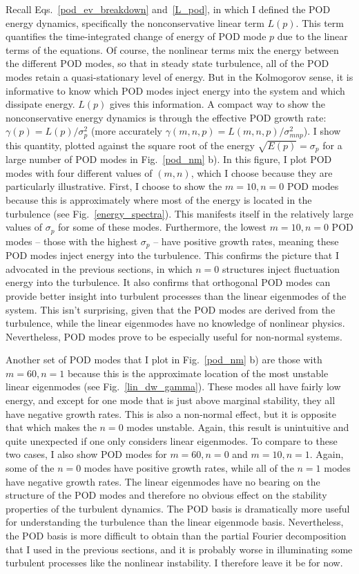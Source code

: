 Recall Eqs.~\ref{pod_ev_breakdown} and~\ref{L_pod}, in which I defined the POD energy dynamics, specifically the nonconservative linear term $L(p)$. This term quantifies the time-integrated
change of energy of POD mode $p$ due to the linear terms of the equations. Of course, the nonlinear terms mix the energy between the different POD modes, so that in steady state turbulence,
all of the POD modes retain a quasi-stationary level of energy. But in the Kolmogorov sense, it is informative to know which POD modes inject energy into the system and which dissipate energy.
$L(p)$ gives this information. 
A compact way to show the nonconservative energy dynamics is through the effective POD growth rate: $\gamma(p) = L(p)/\sigma_p^2$ (more accurately $\gamma(m,n,p) = L(m,n,p)/\sigma_{mnp}^2$). 
I show this quantity, plotted against the square root of the energy $\sqrt{E(p)} = \sigma_p$
for a large number of POD modes in Fig.~\ref{pod_nm} b). In this figure, I plot POD modes with four different values of $(m,n)$, which I choose because they are particularly illustrative.
First, I choose to show the $m=10, n=0$ POD modes because this is approximately where most of the energy is located in the turbulence (see Fig.~\ref{energy_spectra}).
This manifests itself in the relatively large values of $\sigma_p$ for some of these modes. Furthermore, the lowest $m=10, n=0$ POD modes -- those with the highest $\sigma_p$ --
have positive growth rates, meaning these POD modes inject energy into the turbulence. This confirms the picture that I advocated in the previous sections, in which $n=0$ structures
inject fluctuation energy into the turbulence. It also confirms
that orthogonal POD modes can provide better insight into turbulent processes than the linear eigenmodes of the system. This isn't surprising, given that the POD modes are derived from the turbulence,
while the linear eigenmodes have no knowledge of nonlinear physics. Nevertheless, POD modes prove to be especially useful for non-normal systems.

Another set of POD modes that I plot in Fig.~\ref{pod_nm} b) are those with $m=60, n=1$ because this is the approximate location of the most unstable linear eigenmodes (see Fig.~\ref{lin_dw_gamma}).
These modes all have fairly low energy, and except for one mode that is just above marginal stability, they all have negative growth rates. 
This is also a non-normal effect, but it is opposite that which makes the $n=0$ modes unstable.
Again, this result is unintuitive and quite unexpected if one only considers linear eigenmodes.
To compare to these two cases, I also show POD modes for $m=60, n=0$ and $m=10, n=1$. Again, some of the $n=0$ modes have positive growth rates, while all of the $n=1$ modes have negative growth
rates. The linear eigenmodes have no bearing on the structure of the POD modes and therefore no obvious effect on the stability properties of the turbulent dynamics. 
The POD basis is dramatically more useful for understanding the turbulence than the linear eigenmode basis. 
Nevertheless, the POD basis is more difficult to obtain than the partial Fourier decomposition that I used in the previous sections, and it is probably worse in illuminating some turbulent processes
like the nonlinear instability. I therefore leave it be for now.


